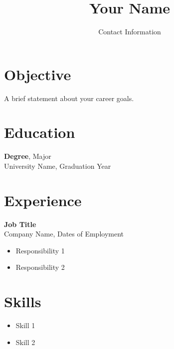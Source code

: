 \documentclass[a4paper,10pt]{article}
\title{Your Name}
\author{Contact Information}
\date{}
\begin{document}
\maketitle

\section*{Objective}
A brief statement about your career goals.

\section*{Education}
\textbf{Degree}, Major \\
University Name, Graduation Year

\section*{Experience}
\textbf{Job Title} \\
Company Name, Dates of Employment
\begin{itemize}[leftmargin=*]
    \item Responsibility 1
    \item Responsibility 2
\end{itemize}

\section*{Skills}
\begin{itemize}[leftmargin=*]
    \item Skill 1
    \item Skill 2
\end{itemize}
\end{document}
